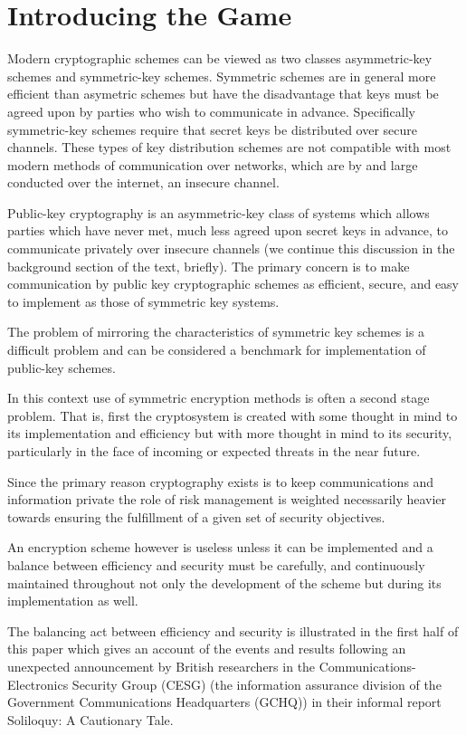 \documentclass{article}
\begin{document}
	
	
\section{Introducing the Game}

Modern cryptographic schemes can be viewed as two classes
asymmetric-key schemes and symmetric-key schemes.
Symmetric schemes are in general more efficient than asymetric
schemes but have the disadvantage that keys must be agreed upon by
parties who wish to communicate in advance. Specifically symmetric-key
schemes require that secret keys be distributed over secure channels.
These types of key distribution schemes are not compatible with most
modern methods of communication over networks, which are by and large
conducted over the internet, an insecure channel.

Public-key cryptography is an asymmetric-key class of systems which
allows parties which have never met, much less agreed upon secret keys
in advance, to communicate privately over insecure channels (we
continue this discussion in the background section of the text,
briefly). The primary concern is to make communication by public key
cryptographic schemes as efficient, secure, and easy to implement as
those of symmetric key systems.

The problem of mirroring the characteristics of symmetric key
schemes is a difficult problem and can be considered a benchmark for
implementation of public-key schemes.

In this context use of symmetric encryption methods is often a second
stage problem. That is, first the cryptosystem is created with some
thought in mind to its implementation and efficiency but with more
thought in mind to its security, particularly in the face of incoming
or expected threats in the near future.

Since the primary reason cryptography exists is to keep
communications and information private the role of risk management is
weighted necessarily heavier towards ensuring the fulfillment of a
given set of security objectives.

An encryption scheme however is useless unless it can be implemented
and a balance between efficiency and security must be carefully, and
continuously maintained throughout not only the development of the
scheme but during its implementation as well.

The balancing act between efficiency and security is illustrated in
the first half of this paper which gives an account of the events and
results following an unexpected announcement by British researchers in
the Communications-Electronics Security Group (CESG) (the information
assurance division of the Government Communications Headquarters
(GCHQ)) in their informal report Soliloquy: A Cautionary Tale.
\end{document}
